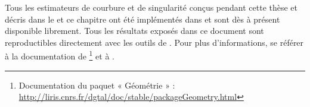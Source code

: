 Tous les estimateurs de courbure et de singularité conçus pendant cette thèse et
décris dans le  et ce chapitre ont été implémentés
dans \DGtal et sont dès à présent disponible librement. Tous les résultats
exposés dans ce document sont reproductibles directement avec les outils de \DGtal. Pour plus d'informations, se référer à la documentation de \DGtal\footnote{Documentation du paquet « Géométrie » :
\url{http://liris.cnrs.fr/dgtal/doc/stable/packageGeometry.html}} et à \cite{Coeurjolly2013Implementation}.
